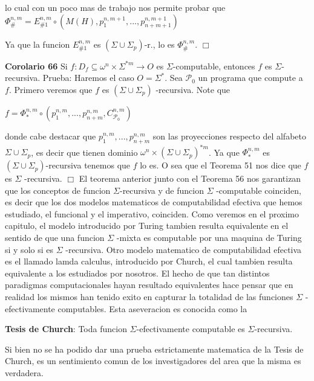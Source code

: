 lo cual con un poco mas de trabajo nos permite probar que
\(\displaystyle \Phi _{\#}^{n,m}=E_{\#1}^{n,m}\circ \left( M(H),p_{1}^{n,m+1},...,p_{n+m+1}^{n,m+1}\right) \)

Ya que la funcion \(E_{\#1}^{n,m}\) es \((\Sigma \cup \Sigma _{p})\)-r., lo es \( \Phi _{\#}^{n,m}\). \(\Box\)



\textbf{Corolario 66} Si \(f:D_{f}\subseteq \omega ^{n}\times \Sigma ^{\ast m}\rightarrow O\) es \( \Sigma \)-computable, entonces \(f\) es \(\Sigma \)-recursiva.
Prueba: Haremos el caso \(O=\Sigma ^{\ast }\). Sea \(\mathcal{P}_{0}\) un programa que compute a \(f\). Primero veremos que \(f\) es \((\Sigma \cup \Sigma _{p})\) -recursiva. Note que

\(\displaystyle f=\Phi _{\ast }^{n,m}\circ \left( p_{1}^{n,m},...,p_{n+m}^{n,m},C_{\mathcal{P }_{0}}^{n,m}\right) \)

donde cabe destacar que \(p_{1}^{n,m},...,p_{n+m}^{n,m}\) son las proyecciones respecto del alfabeto \(\Sigma \cup \Sigma _{p}\), es decir que tienen dominio \(\omega ^{n}\times (\Sigma \cup \Sigma _{p})^{\ast m}\). Ya que \(\Phi _{\ast }^{n,m}\) es \((\Sigma \cup \Sigma _{p})\)-recursiva tenemos que \(f\) lo es. O sea que el Teorema 51 nos dice que \(f\) es \(\Sigma \) -recursiva. \(\Box\)
El teorema anterior junto con el Teorema 56 nos garantizan que los conceptos de funcion \(\Sigma \)-recursiva y de funcion \(\Sigma \) -computable coinciden, es decir que los dos modelos matematicos de computabilidad efectiva que hemos estudiado, el funcional y el imperativo, coinciden. Como veremos en el proximo capitulo, el modelo introducido por Turing tambien resulta equivalente en el sentido de que una funcion \(\Sigma \) -mixta es computable por una maquina de Turing si y solo si es \(\Sigma \) -recursiva. Otro modelo matematico de computabilidad efectiva es el llamado lamda calculus, introducido por Church, el cual tambien resulta equivalente a los estudiados por nosotros. El hecho de que tan distintos paradigmas computacionales hayan resultado equivalentes hace pensar que en realidad los mismos han tenido exito en capturar la totalidad de las funciones \(\Sigma \) -efectivamente computables. Esta aseveracion es conocida como la



\textbf{Tesis de Church}: Toda funcion \(\Sigma \)-efectivamente computable es \(\Sigma \)-recursiva.

Si bien no se ha podido dar una prueba estrictamente matematica de la Tesis de Church, es un sentimiento comun de los investigadores del area que la misma es verdadera.

